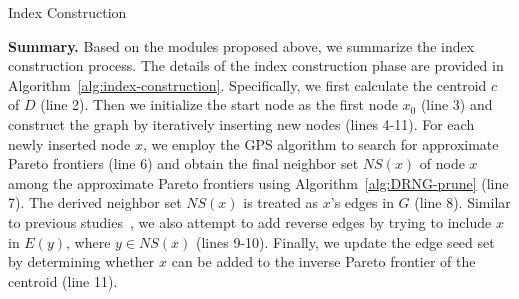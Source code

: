 \begin{algorithm}[t]
    \caption{Index Construction}
    \small
    \label{alg:index-construction}
    \BlankLine    
\end{algorithm}




\noindent\textbf{Summary.} Based on the modules proposed above, we summarize the index construction process. The details of the index construction phase are provided in Algorithm~\ref{alg:index-construction}. Specifically, we first calculate the centroid $c$ of $D$ (line 2). %
Then we initialize the start node as the first node $x_0$ (line 3) and construct the graph by iteratively inserting new nodes (lines 4-11). For each newly inserted node $x$, we employ the GPS algorithm to search for approximate Pareto frontiers (line 6) and obtain the final neighbor set $NS(x)$ of node $x$ among the approximate Pareto frontiers using Algorithm~\ref{alg:DRNG-prune} (line 7). The derived neighbor set $NS(x)$ is treated as $x$'s edges in $G$ (line 8). Similar to previous studies~\cite{malkovEfficientRobustApproximate2020}, we also attempt to add reverse edges by trying to include $x$ in $E(y)$, where $y \in NS(x)$ (lines 9-10). Finally, we update the edge seed set by determining whether $x$ can be added to the inverse Pareto frontier of the centroid (line 11). 

